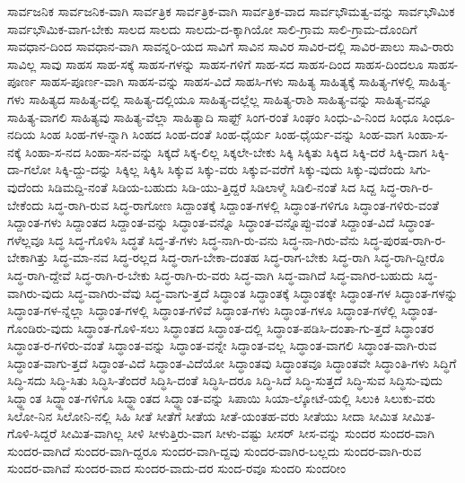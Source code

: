{ಸಾರ್ವಜನಿಕ
ಸಾರ್ವಜನಿಕ-ವಾಗಿ
ಸಾರ್ವತ್ರಿಕ
ಸಾರ್ವತ್ರಿಕ-ವಾಗಿ
ಸಾರ್ವತ್ರಿಕ-ವಾದ
ಸಾರ್ವಭೌಮತ್ವ-ವನ್ನು
ಸಾರ್ವಭೌಮಿಕ
ಸಾರ್ವಭೌಮಿಕ-ವಾಗ-ಬೇಕು
ಸಾಲದ
ಸಾಲದು
ಸಾಲದು-ದ-ಕ್ಕಾಗಿಯೋ
ಸಾಲಿ-ಗ್ರಾಮ
ಸಾಲಿ-ಗ್ರಾಮ-ದೊಂದಿಗೆ
ಸಾವಧಾನ-ದಿಂದ
ಸಾವಧಾನ-ವಾಗಿ
ಸಾವನ್ನರಿ-ಯದ
ಸಾವಿಗೆ
ಸಾವಿನ
ಸಾವಿರ
ಸಾವಿರ-ದಲ್ಲಿ
ಸಾವಿರ-ಪಾಲು
ಸಾವಿ-ರಾರು
ಸಾವಿಲ್ಲ
ಸಾವು
ಸಾಹಸ
ಸಾಹ-ಸಕ್ಕೆ
ಸಾಹಸ-ಗಳನ್ನು
ಸಾಹಸ-ಗಳಿಗೆ
ಸಾಹ-ಸದ
ಸಾಹಸ-ದಿಂದ
ಸಾಹಸ-ದಿಂದಲೂ
ಸಾಹಸ-ಪೂರ್ಣ
ಸಾಹಸ-ಪೂರ್ಣ-ವಾಗಿ
ಸಾಹಸ-ವನ್ನು
ಸಾಹಸ-ವಿದೆ
ಸಾಹಸಿ-ಗಳು
ಸಾಹಿತ್ಯ
ಸಾಹಿತ್ಯಕ್ಕೆ
ಸಾಹಿತ್ಯ-ಗಳಲ್ಲಿ
ಸಾಹಿತ್ಯ-ಗಳು
ಸಾಹಿತ್ಯದ
ಸಾಹಿತ್ಯ-ದಲ್ಲಿ
ಸಾಹಿತ್ಯ-ದಲ್ಲಿಯೂ
ಸಾಹಿತ್ಯ-ದಲ್ಲೆಲ್ಲ
ಸಾಹಿತ್ಯ-ರಾಶಿ
ಸಾಹಿತ್ಯ-ವನ್ನು
ಸಾಹಿತ್ಯ-ವನ್ನೂ
ಸಾಹಿತ್ಯ-ವಾಗಲಿ
ಸಾಹಿತ್ಯವು
ಸಾಹಿತ್ಯ-ವೆಲ್ಲಾ
ಸಾಹಿತ್ಯಾದಿ
ಸಾಫ್ಟ್
ಸಿಂಗ-ರಂತೆ
ಸಿಂಘಂ
ಸಿಂಧು-ವಿ-ನಿಂದ
ಸಿಂಧೂ
ಸಿಂಧೂ-ನದಿಯ
ಸಿಂಹ
ಸಿಂಹ-ಗಳ-ನ್ನಾಗಿ
ಸಿಂಹದ
ಸಿಂಹ-ದಂತೆ
ಸಿಂಹ-ಧೈರ್ಯ
ಸಿಂಹ-ಧೈರ್ಯ-ವನ್ನು
ಸಿಂಹ-ವಾಗ
ಸಿಂಹಾ-ಸ-ನಕ್ಕೆ
ಸಿಂಹಾ-ಸ-ನದ
ಸಿಂಹಾ-ಸನ-ವನ್ನು
ಸಿಕ್ಕದೆ
ಸಿಕ್ಕ-ಲಿಲ್ಲ
ಸಿಕ್ಕಲೇ-ಬೇಕು
ಸಿಕ್ಕಿ
ಸಿಕ್ಕಿತು
ಸಿಕ್ಕಿದ
ಸಿಕ್ಕಿ-ದರೆ
ಸಿಕ್ಕಿ-ದಾಗ
ಸಿಕ್ಕಿ-ದಾ-ಗಲೋ
ಸಿಕ್ಕಿ-ದ್ದು-ದನ್ನು
ಸಿಕ್ಕಿಲ್ಲ
ಸಿಕ್ಕಿಸಿ
ಸಿಕ್ಕುವ
ಸಿಕ್ಕು-ವರು
ಸಿಕ್ಕುವ-ವರೆಗೆ
ಸಿಕ್ಕು-ವುದು
ಸಿಕ್ಕು-ವುದೆಂದು
ಸಿಗು-ವುದೆಂದು
ಸಿಡಿಮದ್ದಿ-ನಂತೆ
ಸಿಡಿಯ-ಬಹುದು
ಸಿಡಿ-ಯು-ತ್ತಿದ್ದರೆ
ಸಿಡಿಲಾಳ್ಮೆ
ಸಿಡಿಲಿ-ನಂತೆ
ಸಿದ
ಸಿದ್ದ
ಸಿದ್ಧ-ರಾಗಿ-ರ-ಬೇಕೆಂದು
ಸಿದ್ಧ-ರಾಗಿ-ರುವ
ಸಿದ್ಧ-ರಾಗೋಣ
ಸಿದ್ದಾಂತಕ್ಕೆ
ಸಿದ್ದಾಂತ-ಗಳಲ್ಲಿ
ಸಿದ್ಧಾಂತ-ಗಳಿಗೂ
ಸಿದ್ಧಾಂತ-ಗಳಿರು-ವಂತೆ
ಸಿದ್ದಾಂತ-ಗಳು
ಸಿದ್ದಾಂತದ
ಸಿದ್ದಾಂತ-ವನ್ನು
ಸಿದ್ಧಾಂತ-ವನ್ನೊ
ಸಿದ್ಧಾಂತ-ವನ್ನೊಪ್ಪು-ವಂತೆ
ಸಿದ್ದಾಂತ-ವಿದೆ
ಸಿದ್ಧಾಂತ-ಗಳೆಲ್ಲವೂ
ಸಿದ್ಧ
ಸಿದ್ಧ-ಗೊಳಿಸಿ
ಸಿದ್ಧತೆ
ಸಿದ್ಧ-ತೆ-ಗಳು
ಸಿದ್ಧ-ನಾಗಿ-ರು-ವನು
ಸಿದ್ಧ-ನಾ-ಗಿರು-ವೆನು
ಸಿದ್ಧ-ಪುರಷ-ರಾಗಿ-ರ-ಬೇಕಾಗಿತ್ತು
ಸಿದ್ಧ-ಮಾ-ನವ
ಸಿದ್ಧ-ರಲ್ಲದ
ಸಿದ್ಧ-ರಾಗ-ಬೇಕಾ-ದಂತಹ
ಸಿದ್ಧ-ರಾಗ-ಬೇಕು
ಸಿದ್ಧ-ರಾಗಿ
ಸಿದ್ಧ-ರಾಗಿ-ದ್ದೀರೊ
ಸಿದ್ಧ-ರಾಗಿ-ದ್ದೇವೆ
ಸಿದ್ಧ-ರಾಗಿ-ರ-ಬೇಕು
ಸಿದ್ಧ-ರಾಗಿ-ರು-ವರು
ಸಿದ್ಧ-ವಾಗಿ
ಸಿದ್ಧ-ವಾಗಿದೆ
ಸಿದ್ಧ-ವಾಗಿರ-ಬಹುದು
ಸಿದ್ಧ-ವಾಗಿರು-ವುದು
ಸಿದ್ಧ-ವಾಗಿರು-ವೆವು
ಸಿದ್ಧ-ವಾಗು-ತ್ತದೆ
ಸಿದ್ಧಾಂತ
ಸಿದ್ಧಾಂತಕ್ಕೆ
ಸಿದ್ಧಾಂತಕ್ಕೇ
ಸಿದ್ಧಾಂತ-ಗಳ
ಸಿದ್ಧಾಂತ-ಗಳನ್ನು
ಸಿದ್ಧಾಂತ-ಗಳ-ನ್ನೆಲ್ಲಾ
ಸಿದ್ಧಾಂತ-ಗಳಲ್ಲಿ
ಸಿದ್ಧಾಂತ-ಗಳಿವೆ
ಸಿದ್ಧಾಂತ-ಗಳು
ಸಿದ್ಧಾಂತ-ಗಳೂ
ಸಿದ್ಧಾಂತ-ಗಳೆಲ್ಲಿ
ಸಿದ್ಧಾಂತ-ಗೊಂಡಿರು-ವುದು
ಸಿದ್ಧಾಂತ-ಗೊಳಿ-ಸಲು
ಸಿದ್ಧಾಂತದ
ಸಿದ್ಧಾಂತ-ದಲ್ಲಿ
ಸಿದ್ಧಾಂತ-ಪಡಿಸಿ-ದಂತಾ-ಗು-ತ್ತದೆ
ಸಿದ್ಧಾಂತರ
ಸಿದ್ಧಾಂತ-ರ-ಗಳಿರು-ವಂತೆ
ಸಿದ್ಧಾಂತ-ವನ್ನು
ಸಿದ್ಧಾಂತ-ವನ್ನೇ
ಸಿದ್ಧಾಂತ-ವಲ್ಲ
ಸಿದ್ಧಾಂತ-ವಾಗಲಿ
ಸಿದ್ಧಾಂತ-ವಾಗಿ-ರುವ
ಸಿದ್ಧಾಂತ-ವಾಗು-ತ್ತದೆ
ಸಿದ್ಧಾಂತ-ವಿದೆ
ಸಿದ್ಧಾಂತ-ವಿದೆಯೋ
ಸಿದ್ಧಾಂತವು
ಸಿದ್ಧಾಂತವೂ
ಸಿದ್ಧಾಂತವೇ
ಸಿದ್ಧಾಂತಿ-ಗಳು
ಸಿದ್ಧಿಗೆ
ಸಿದ್ಧಿ-ಸದು
ಸಿದ್ಧಿ-ಸಿತು
ಸಿದ್ಧಿಸಿ-ತೆಂದರೆ
ಸಿದ್ಧಿಸಿ-ದಂತೆ
ಸಿದ್ಧಿಸಿ-ದರೂ
ಸಿದ್ಧಿ-ಸಿದೆ
ಸಿದ್ಧಿ-ಸುತ್ತದೆ
ಸಿದ್ಧಿ-ಸುವ
ಸಿದ್ಧಿಸು-ವುದು
ಸಿದ್ಧ್ದಾಂತ
ಸಿದ್ಧ್ದಾಂತ-ಗಳಿಗೂ
ಸಿದ್ಧ್ದಾಂತದ
ಸಿದ್ಧ್ದಾಂತ-ವನ್ನು
ಸಿಪಾಯಿ
ಸಿಯಾ-ಲ್ಕೋಟೆ-ಯಲ್ಲಿ
ಸಿಲುಕಿ
ಸಿಲುಕು-ವರು
ಸಿಲೋ-ನಿನ
ಸಿಲೋನಿ-ನಲ್ಲಿ
ಸಿಹಿ
ಸೀತೆ
ಸೀತೆಗೆ
ಸೀತೆಯ
ಸೀತೆ-ಯಂತಹ-ವರು
ಸೀತೆಯು
ಸೀದಾ
ಸೀಮಿತ
ಸೀಮಿತ-ಗೊಳಿ-ಸಿದ್ದರೆ
ಸೀಮಿತ-ವಾಗಿಲ್ಲ
ಸೀಳಿ
ಸೀಳುತ್ತಿರು-ವಾಗ
ಸೀಳು-ವಷ್ಟು
ಸೀಸರ್
ಸೀಸ-ವನ್ನು
ಸುಂದರ
ಸುಂದರ-ವಾಗಿ
ಸುಂದರ-ವಾಗಿದೆ
ಸುಂದರ-ವಾಗಿ-ದ್ದರೂ
ಸುಂದರ-ವಾಗಿ-ದ್ದವು
ಸುಂದರ-ವಾಗಿರ-ಬಲ್ಲದು
ಸುಂದರ-ವಾಗಿ-ರುವ
ಸುಂದರ-ವಾಗಿವೆ
ಸುಂದರ-ವಾದ
ಸುಂದರ-ವಾದು-ದರ
ಸುಂದ-ರವೂ
ಸುಂದರಿ
ಸುಂದರೀಂ
}
